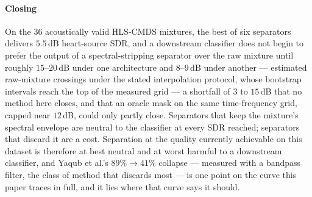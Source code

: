 \documentclass[conference]{IEEEtran}
\begin{document}
\paragraph{Closing}
On the 36 acoustically valid HLS-CMDS mixtures, the best of six separators delivers $5.5$\,dB heart-source SDR, and a downstream classifier does not begin to prefer the output of a spectral-stripping separator over the raw mixture until roughly $15$--$20$\,dB under one architecture and $8$--$9$\,dB under another --- estimated raw-mixture crossings under the stated interpolation protocol, whose bootstrap intervals reach the top of the measured grid --- a shortfall of $3$ to $15$\,dB that no method here closes, and that an oracle mask on the same time-frequency grid, capped near $12$\,dB, could only partly close. Separators that keep the mixture's spectral envelope are neutral to the classifier at every SDR reached; separators that discard it are a cost. Separation at the quality currently achievable on this dataset is therefore at best neutral and at worst harmful to a downstream classifier, and Yaqub et al.'s $89\% \to 41\%$ collapse --- measured with a bandpass filter, the class of method that discards most --- is one point on the curve this paper traces in full, and it lies where that curve says it should.
\end{document}

